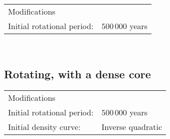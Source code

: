 \documentclass[../main.tex]{subfiles}
\begin{document}
\begin{tabular}{ll}
\multicolumn{2}{l}{Modifications} \\
    \qquad Initial rotational period:          & $500 \, 000$ years \\
\end{tabular}
\\

\subsection{Rotating, with a dense core}

\begin{tabular}{ll}
\multicolumn{2}{l}{Modifications} \\
    \qquad Initial rotational period:          & $500 \, 000$ years \\
    \qquad Initial density curve:              & Inverse quadratic \\
\end{tabular}
\\
\end{document}

